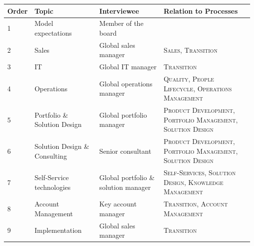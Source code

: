 \begin{table}[caption={Interviews and Relations to Processes}, label={tab:interv}]
	\centering
	
	\begin{tabular}{p{1cm} p{3.4cm}  p{4cm}  p{5cm} }
		\textbf{Order} & \textbf{Topic} & \textbf{Interviewee}          & \textbf{Relation to Processes}                          \\ \hline \hline
		1                            & Model expectations            & Member of the board                  &                                                                         \\\hline
		2                            & Sales                         & Global sales manager                 & \textsc{Sales}, \textsc{Transition}                                                       \\\hline
		3                            & IT                            & Global IT manager                    & \textsc{Transition}                                                              \\\hline
		4                            & Operations                    & Global operations manager            & \textsc{Quality}, \textsc{People Lifecycle}, \textsc{Operations Management} \\\hline
		5                            & Portfolio \& Solution Design  & Global portfolio manager             & \textsc{Product Development}, \textsc{Portfolio Management}, \textsc{Solution Design }             \\\hline
		6                            & Solution Design \& Consulting & Senior consultant                    & \textsc{Product Development}, \textsc{Portfolio Management}, \textsc{Solution Design}              \\\hline
		7                            & Self-Service technologies     & Global portfolio \& solution manager & \textsc{Self-Services}, \textsc{Solution Design}, \textsc{Knowledge Management}                     \\\hline
		8                            & Account Management            & Key account manager                  & \textsc{Transition}, \textsc{Account Management  }                                                    \\\hline
		9                            & Implementation                & Global sales manager                 & \textsc{Transition}                                                             
	\end{tabular}
\end{table}

